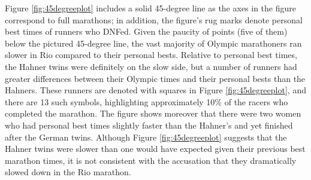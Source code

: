 \documentclass[12pt,titlepage]{article}
\begin{document}
Figure \ref{fig:45degreeplot} includes a solid 45-degree line as
the axes in the figure correspond to full marathons; in addition, the
figure's rug marks denote personal best times of runners who DNFed.
Given the paucity of points (five of them) below the pictured
45-degree line, the vast majority of Olympic marathoners ran slower in
Rio compared to their personal bests.  Relative to personal best
times, the Hahner twins were definitely on the slow side, but a number
of runners had greater differences between their Olympic times and
their personal bests than the Hahners.  These runners are denoted with
squares in Figure \ref{fig:45degreeplot}, and there are 13 such
symbols, highlighting approximately 10\% of the racers who completed
the marathon.  The figure shows moreover that there were two women who
had personal best times slightly faster than the Hahner's and yet
finished after the German twins.  Although Figure
\ref{fig:45degreeplot} suggests that the Hahner twins were slower than
one would have expected given their previous best marathon times, it
is not consistent with the accusation that they dramatically slowed
down in the Rio marathon.

\end{document}
